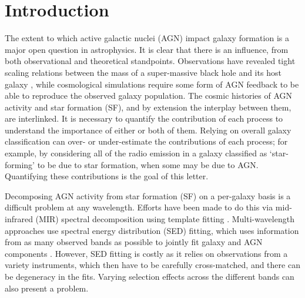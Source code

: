 \documentclass[usenatbib,fleqn,letters]{mnras}
\begin{document}
\section{Introduction}
\label{sec:intro}
The extent to which active galactic nuclei (AGN) impact galaxy formation is a major open question in astrophysics. It is clear that there is an influence, from both observational and theoretical standpoints. Observations have revealed tight scaling relations between the mass of a super-massive black hole and its host galaxy \citep[see, e.g.][and references therein]{kormendy_coevolution_2013}, while cosmological simulations require some form of AGN feedback \citep{bower_breaking_2006,croton_many_2006} to be able to reproduce the observed galaxy population. 
The cosmic histories of AGN activity and star formation (SF), and by extension the interplay between them, are interlinked. It is necessary to quantify the contribution of each process to understand the importance of either or both of them. Relying on overall galaxy classification can over- or under-estimate the contributions of each process; for example, by considering all of the radio emission in a galaxy classified as `star-forming' to be due to star formation, when some may be due to AGN. Quantifying these contributions is the goal of this letter. 

Decomposing AGN activity from star formation (SF) on a per-galaxy basis is a difficult problem at any wavelength. Efforts have been made to do this via mid-infrared (MIR) spectral decomposition using template fitting \citep[e.g.,][]{laurent_mid-infrared_2000,hernan-caballero_resolving_2015,li_active_2024}. Multi-wavelength approaches use spectral energy distribution (SED) fitting, which uses information from as many observed bands as possible to jointly fit galaxy and AGN components \citep[e.g.][]{calistro_rivera_agnfitter_2016,boquien_cigale_2019,pacifici_art_2023}. However, SED fitting is costly as it relies on observations from a variety instruments, which then have to be carefully cross-matched, and there can be degeneracy in the fits. Varying selection effects across the different bands can also present a problem. 
\end{document}
